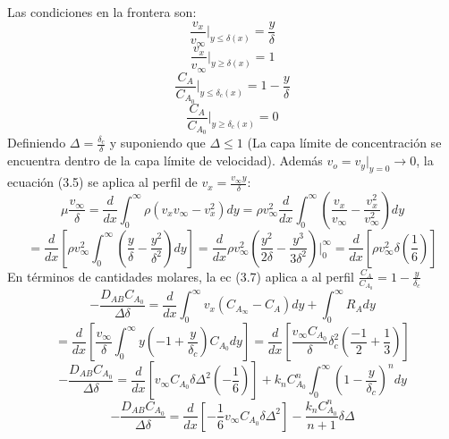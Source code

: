 Las condiciones en la frontera son:
\begin{equation*}
    \frac{v_x}{v_\infty}|_{y\leq\delta (x)}=\frac{y}{\delta}
\end{equation*}
  \begin{equation}
      \frac{v_x}{v_\infty}|_{y\geq\delta (x)}=1
  \end{equation}
\begin{equation*}
    \frac{C_A}{C_{A_0}}|_{y\leq\delta_c(x)}=1-\frac{y}{\delta}
\end{equation*}
\begin{equation}
    \frac{C_A}{C_{A_0}}|_{y\geq\delta_c(x)}=0
\end{equation}
Definiendo $\Delta=\frac{\delta_c}{\delta}$ y suponiendo que $\Delta\leq1$ (La capa límite de concentración se encuentra dentro de la capa límite de velocidad). Además $v_o=v_y|_{y=0}\rightarrow 0$, la ecuación (3.5) se aplica al perfil de $v_x=\frac{v_\infty y}{\delta}$:
\begin{equation*}
    \mu\frac{v_\infty}{\delta}=\frac{d}{dx}\int_0^\infty \rho (v_xv_\infty-v_x^2)dy=\rho v_\infty^2 \frac{d}{dx}\int_0^\infty (\frac{v_x}{v_\infty}-\frac{v_x^2}{v_\infty^2})dy
\end{equation*}
\begin{equation}
    =\frac{d}{dx}[\rho v_\infty^2\int_0^\infty(\frac{y}{\delta}-\frac{y^2}{\delta ^2})dy]=\frac{d}{dx}\rho v_\infty^2 (\frac{y^2}{2\delta}-\frac{y^3}{3\delta ^2})|_0^\infty=\frac{d}{dx}[\rho v_\infty ^2 \delta (\frac{1}{6})]
\end{equation}
 En términos de cantidades molares, la ec (3.7) aplica a al perfil $\frac{C_A}{C_{A_0}}=1-\frac{y}{\delta_c}$   
 \begin{equation*}
     -\frac{D_{AB}C_{A_0}}{\Delta \delta}=\frac{d}{dx}\int_0^\infty v_x(C_{A_\infty}-C_A)dy+\int_0^\infty R_A dy
 \end{equation*}
\begin{equation*}
    =\frac{d}{dx}[\frac{v_\infty}{\delta}\int_0^\infty y(-1+\frac{y}{\delta _c})C_{A_0}dy]=\frac{d}{dx}[\frac{v_\infty C_{A_0}}{\delta}\delta_c^2(\frac{-1}{2}+\frac{1}{3})]
\end{equation*}
\begin{equation*}
    -\frac{D_{AB}C_{A_0}}{\Delta \delta}=\frac{d}{dx}[v_\infty C_{A_0}\delta \Delta^2(-\frac{1}{6})]+k_nC_{A_0}^n \int_0^\infty (1-\frac{y}{\delta_c})^ndy
\end{equation*}
\begin{equation}
    -\frac{D_{AB}C_{A_0}}{\Delta \delta}=\frac{d}{dx}[-\frac{1}{6}v_\infty C_{A_0}\delta \Delta^2]-\frac{k_nC_{A_0}^n}{n+1}\delta \Delta
\end{equation}
